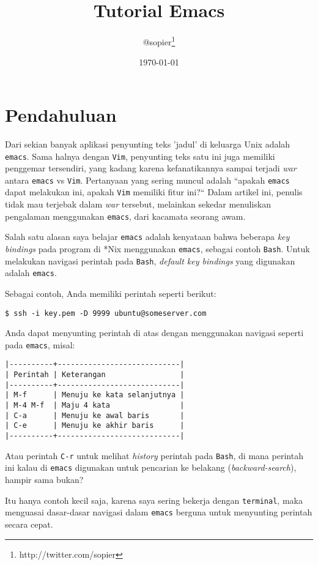 \documentclass{article}
\title{Tutorial Emacs}
\author{@sopier\footnote{http://twitter.com/sopier}}
\date{\today}
\begin{document}
\maketitle
\tableofcontents
\pagebreak

\section{Pendahuluan}
Dari sekian banyak aplikasi penyunting teks 'jadul' di keluarga
Unix adalah \verb=emacs=. Sama halnya dengan \verb=Vim=, penyunting
teks satu ini juga memiliki penggemar tersendiri, yang kadang
karena kefanatikannya sampai terjadi \emph{war} antara \verb=emacs=
vs \verb=Vim=. Pertanyaan yang sering muncul adalah ``apakah
\verb=emacs= dapat melakukan ini, apakah \verb=Vim= memiliki fitur
ini?`` Dalam artikel ini, penulis tidak mau terjebak dalam 
\emph{war} tersebut, melainkan sekedar menuliskan pengalaman 
menggunakan \verb=emacs=, dari kacamata seorang awam.

Salah satu alasan saya belajar \verb=emacs= adalah kenyataan
bahwa beberapa \emph{key bindings} pada program di *Nix 
menggunakan \verb=emacs=, sebagai contoh \verb=Bash=. Untuk
melakukan navigasi perintah pada \verb=Bash=, 
\emph{default key bindings} yang digunakan adalah \verb=emacs=.

Sebagai contoh, Anda memiliki perintah seperti berikut:

\begin{verbatim}
$ ssh -i key.pem -D 9999 ubuntu@someserver.com
\end{verbatim}

Anda dapat menyunting perintah di atas dengan menggunakan
navigasi seperti pada \verb=emacs=, misal:

\begin{verbatim}
|----------+----------------------------|
| Perintah | Keterangan                 |
|----------+----------------------------|
| M-f      | Menuju ke kata selanjutnya |
| M-4 M-f  | Maju 4 kata                |
| C-a      | Menuju ke awal baris       |
| C-e      | Menuju ke akhir baris      |
|----------+----------------------------|
\end{verbatim}

Atau perintah \verb=C-r= untuk melihat \emph{history} perintah
pada \verb=Bash=, di mana perintah ini kalau di \verb=emacs=
digunakan untuk pencarian ke belakang (\emph{backward-search}),
hampir sama bukan?

Itu hanya contoh kecil saja, karena saya sering bekerja dengan
\verb=terminal=, maka menguasai dasar-dasar navigasi dalam
\verb=emacs= berguna untuk menyunting perintah secara cepat.
\end{document}
